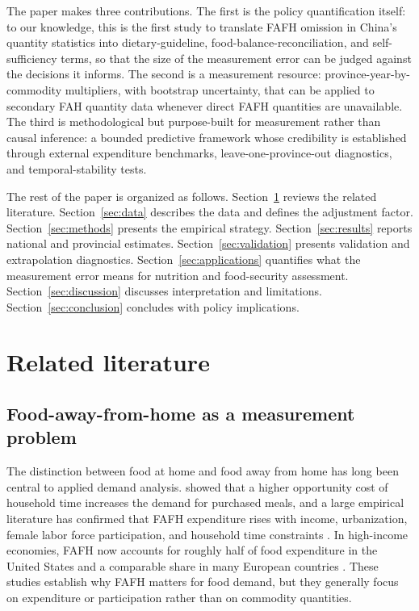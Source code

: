 \documentclass[preprint,12pt,authoryear]{elsarticle}
\begin{document}
The paper makes three contributions. The first is the policy quantification itself: to our knowledge, this is the first study to translate FAFH omission in China's quantity statistics into dietary-guideline, food-balance-reconciliation, and self-sufficiency terms, so that the size of the measurement error can be judged against the decisions it informs. The second is a measurement resource: province-year-by-commodity multipliers, with bootstrap uncertainty, that can be applied to secondary FAH quantity data whenever direct FAFH quantities are unavailable. The third is methodological but purpose-built for measurement rather than causal inference: a bounded predictive framework whose credibility is established through external expenditure benchmarks, leave-one-province-out diagnostics, and temporal-stability tests.

The rest of the paper is organized as follows. Section~\ref{sec:literature} reviews the related literature. Section~\ref{sec:data} describes the data and defines the adjustment factor. Section~\ref{sec:methods} presents the empirical strategy. Section~\ref{sec:results} reports national and provincial estimates. Section~\ref{sec:validation} presents validation and extrapolation diagnostics. Section~\ref{sec:applications} quantifies what the measurement error means for nutrition and food-security assessment. Section~\ref{sec:discussion} discusses interpretation and limitations. Section~\ref{sec:conclusion} concludes with policy implications.

\section{Related literature}
\label{sec:literature}

\subsection{Food-away-from-home as a measurement problem}

The distinction between food at home and food away from home has long been central to applied demand analysis. \citet{Becker1965} showed that a higher opportunity cost of household time increases the demand for purchased meals, and a large empirical literature has confirmed that FAFH expenditure rises with income, urbanization, female labor force participation, and household time constraints \citep{Byrne1996, AguilarHurst2005, Angulo2007, Mancino2007}. In high-income economies, FAFH now accounts for roughly half of food expenditure in the United States and a comparable share in many European countries \citep{Saksena2018, MacLachlan2025}. These studies establish why FAFH matters for food demand, but they generally focus on expenditure or participation rather than on commodity quantities.
\end{document}
